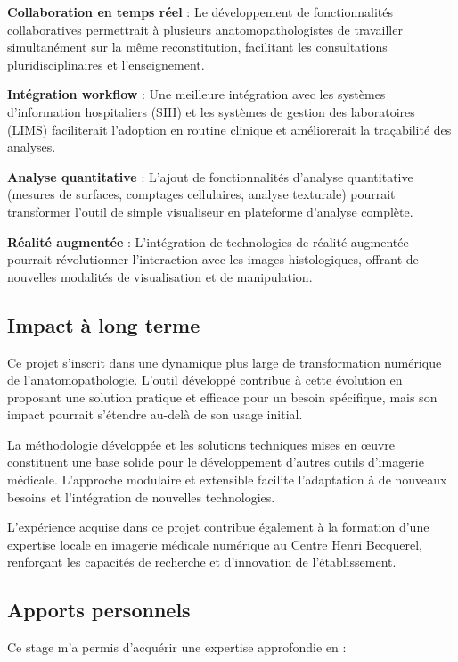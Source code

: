 \documentclass[12pt,a4paper]{report}
\begin{document}
\begin{}
\begin{}
\begin{}
\textbf{Collaboration en temps réel} : Le développement de fonctionnalités collaboratives permettrait à plusieurs anatomopathologistes de travailler simultanément sur la même reconstitution, facilitant les consultations pluridisciplinaires et l'enseignement.

\textbf{Intégration workflow} : Une meilleure intégration avec les systèmes d'information hospitaliers (SIH) et les systèmes de gestion des laboratoires (LIMS) faciliterait l'adoption en routine clinique et améliorerait la traçabilité des analyses.

\textbf{Analyse quantitative} : L'ajout de fonctionnalités d'analyse quantitative (mesures de surfaces, comptages cellulaires, analyse texturale) pourrait transformer l'outil de simple visualiseur en plateforme d'analyse complète.

\textbf{Réalité augmentée} : L'intégration de technologies de réalité augmentée pourrait révolutionner l'interaction avec les images histologiques, offrant de nouvelles modalités de visualisation et de manipulation.

\subsection{Impact à long terme}

Ce projet s'inscrit dans une dynamique plus large de transformation numérique de l'anatomopathologie. L'outil développé contribue à cette évolution en proposant une solution pratique et efficace pour un besoin spécifique, mais son impact pourrait s'étendre au-delà de son usage initial.

La méthodologie développée et les solutions techniques mises en œuvre constituent une base solide pour le développement d'autres outils d'imagerie médicale. L'approche modulaire et extensible facilite l'adaptation à de nouveaux besoins et l'intégration de nouvelles technologies.

L'expérience acquise dans ce projet contribue également à la formation d'une expertise locale en imagerie médicale numérique au Centre Henri Becquerel, renforçant les capacités de recherche et d'innovation de l'établissement.

\subsection{Apports personnels}

\begin{center}
Ce stage m'a permis d'acquérir une expertise approfondie en :
\end{center}


\end{}
\end{}
\end{}
\end{document}
